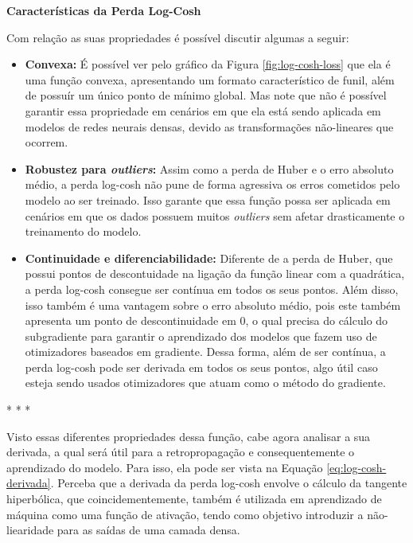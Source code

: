 \textbf{Características da Perda Log-Cosh}
\vspace{1em}

Com relação as suas propriedades é possível discutir algumas a seguir:

\begin{itemize}
    \item \textbf{Convexa:} É possível ver pelo gráfico da Figura \ref{fig:log-cosh-loss} que ela é uma função convexa, apresentando um formato característico de funil, além de possuír um único ponto de mínimo global. Mas note que não é possível garantir essa propriedade em cenários em que ela está sendo aplicada em modelos de redes neurais densas, devido as transformações não-lineares que ocorrem.
    \item \textbf{Robustez para \textit{outliers}:} Assim como a perda de Huber e o erro absoluto médio, a perda log-cosh não pune de forma agressiva os erros cometidos pelo modelo ao ser treinado. Isso garante que essa função possa ser aplicada em cenários em que os dados possuem muitos \textit{outliers} sem afetar drasticamente o treinamento do modelo.
    \item \textbf{Continuidade e diferenciabilidade:} Diferente de a perda de Huber, que possui pontos de descontuidade na ligação da função linear com a quadrática, a perda log-cosh consegue ser contínua em todos os seus pontos. Além disso, isso também é uma vantagem sobre o erro absoluto médio, pois este também apresenta um ponto de descontinuidade em 0, o qual precisa do cálculo do subgradiente para garantir o aprendizado dos modelos que fazem uso de otimizadores baseados em gradiente. Dessa forma, além de ser contínua, a perda log-cosh pode ser derivada em todos os seus pontos, algo útil caso esteja sendo usados otimizadores que atuam como o método do gradiente.
\end{itemize}

\medskip
\begin{center}
 * * *
\end{center}
\medskip

Visto essas diferentes propriedades dessa função, cabe agora analisar a sua derivada, a qual será útil para a retropropagação e consequentemente o aprendizado do modelo. Para isso, ela pode ser vista na Equação \ref{eq:log-cosh-derivada}. Perceba que a derivada da perda log-cosh envolve o cálculo da tangente hiperbólica, que coincidementemente, também é utilizada em aprendizado de máquina como uma função de ativação, tendo como objetivo introduzir a não-liearidade para as saídas de uma camada densa.

